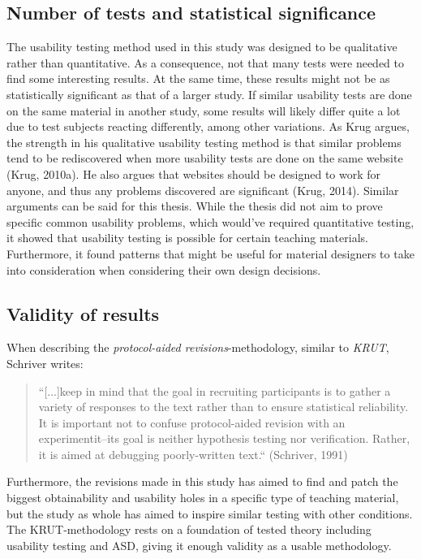 \subsection{Number of tests and statistical significance}
The usability testing method used in this study was designed to be qualitative rather than quantitative. As a consequence, not that many tests were needed to find some interesting results. At the same time, these results might not be as statistically significant as that of a larger study. If similar usability tests are done on the same material in another study, some results will likely differ quite a lot due to test subjects reacting differently, among other variations.
As Krug argues, the strength in his qualitative usability testing method is that similar problems tend to be rediscovered when more usability tests are done on the same website (Krug, 2010a). He also argues that websites should be designed to work for anyone, and thus any problems discovered are significant (Krug, 2014). Similar arguments can be said for this thesis. While the thesis did not aim to prove specific common usability problems, which would've required quantitative testing, it showed that usability testing is possible for certain teaching materials. Furthermore, it found patterns that might be useful for material designers to take into consideration when considering their own design decisions.

\subsection{Validity of results}
When describing the \textit{protocol-aided revisions}-methodology, similar to \textit{KRUT}, Schriver writes:
\begin{quote}
“[...]keep in mind that the goal in recruiting participants is to gather a variety of responses to the text rather than to ensure statistical reliability. It is important not to confuse protocol-aided revision with an experimentit--its goal is neither hypothesis testing nor verification. Rather, it is aimed at debugging poorly-written text.“ (Schriver, 1991)
\end{quote}
Furthermore, the revisions made in this study has aimed to find and patch the biggest obtainability and usability holes in a specific type of teaching material, but the study as whole has aimed to inspire similar testing with other conditions.
The KRUT-methodology rests on a foundation of tested theory including usability testing and ASD, giving it enough validity as a usable methodology.

